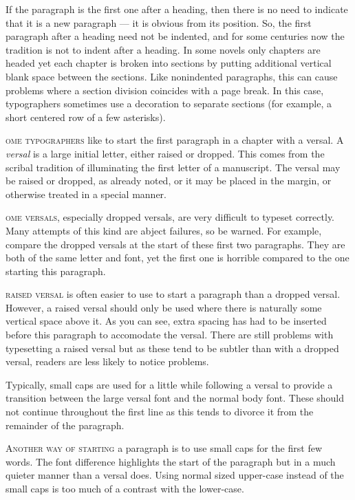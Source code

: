 \documentclass[10pt,a4paper,extrafontsizes]{memoir}
\begin{document}
\begin{paracol}{2}
    If the paragraph is the first one after a heading, 
then there
is no need to indicate that it is a new paragraph --- it is obvious from its
position. So, the first paragraph after a heading 
need not be indented, and for some centuries now 
the tradition is not to indent after a heading.
In some novels only chapters are headed yet each chapter is broken into
sections by putting additional vertical blank space between the sections.
Like nonindented paragraphs, 
this can cause problems where a section division
coincides with a page break. In this case, typographers sometimes use a
decoration to separate sections (for example, a short centered row of a few
asterisks).
\end{paracol}   


\begin{paracol}{2}
\switchEng
{}\textsc{ome typographers} 
like to start the first paragraph in a chapter
with a versal. A \emph{versal} is a large initial letter, either raised or
dropped. This comes from the scribal tradition of illuminating the first
letter of a manuscript. The versal may be raised or dropped, as already noted,
or it may be placed in the margin, or otherwise treated in 
a special manner.

\textsc{ome versals,} especially dropped versals, are very difficult
to typeset correctly. Many attempts of this kind are abject failures, so
be warned. For example, compare the dropped versals at the start of these
first two paragraphs. They are both of the same letter and font, yet the first
one is horrible compared to the one starting this paragraph.


\textsc{raised versal} is often easier to use to 
start a paragraph than a dropped versal. 
However, a raised versal should only be used
where there is naturally some vertical space above it. As you can see, extra
spacing has had to be inserted before this paragraph to accomodate the versal.
There are still problems with typesetting a raised versal but as these tend
to be subtler than with a dropped versal, readers are less likely
to notice problems.

Typically, small caps are used for a little while following a versal to 
provide a transition between the large versal font and the normal body font.
These should not continue throughout the first line as this tends to divorce
it from the remainder of the paragraph. 

\noindent \textsc{Another way of starting} a paragraph is to use small
caps for the first few words. The font difference highlights the start
of the paragraph but in a much quieter manner than a versal does. Using
normal sized upper-case instead of the small caps is too much of a 
contrast with the lower-case.
\end{paracol}
\end{document}
